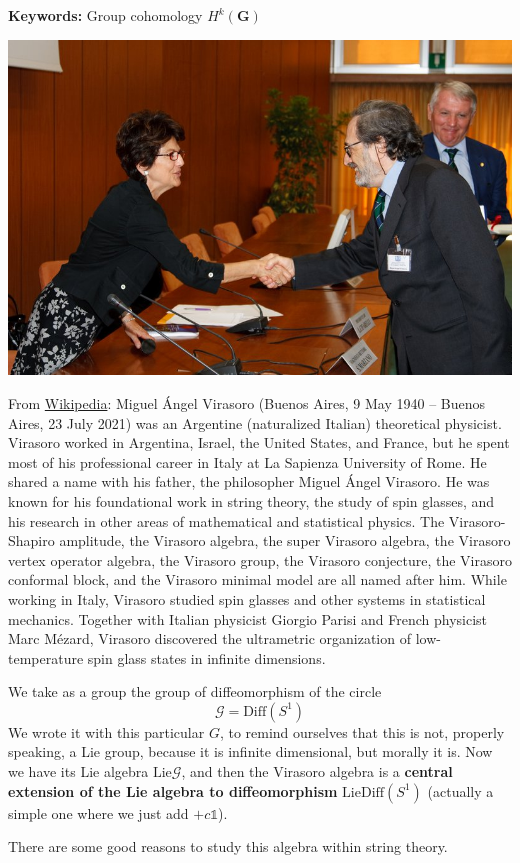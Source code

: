 \documentclass[../main.tex]{subfiles}
\begin{document}
\textbf{Keywords:} Group cohomology $H^k(\mathbf{G})$
\begin{marginfigure}
	\includegraphics[width=1\linewidth]{images/virasoro.jpg}
	\caption[Virasoro at the \textit{Premio E. Fermi 2009}]{From \href{https://en.wikipedia.org/wiki/Miguel_\%C3\%81ngel_Virasoro_(physicist)}{Wikipedia}: Miguel Ángel Virasoro (Buenos Aires, 9 May 1940 – Buenos Aires, 23 July 2021) was an Argentine (naturalized Italian) theoretical physicist. Virasoro worked in Argentina, Israel, the United States, and France, but he spent most of his professional career in Italy at La Sapienza University of Rome. He shared a name with his father, the philosopher Miguel Ángel Virasoro. He was known for his foundational work in string theory, the study of spin glasses, and his research in other areas of mathematical and statistical physics. The Virasoro-Shapiro amplitude, the Virasoro algebra, the super Virasoro algebra, the Virasoro vertex operator algebra, the Virasoro group, the Virasoro conjecture, the Virasoro conformal block, and the Virasoro minimal model are all named after him. While working in Italy, Virasoro studied spin glasses and other systems in statistical mechanics. Together with Italian physicist Giorgio Parisi and French physicist Marc Mézard, Virasoro discovered the ultrametric organization of low-temperature spin glass states in infinite dimensions.}
\end{marginfigure}
\begin{example}
We take as a group the group of diffeomorphism of the circle
\[
\mathcal{G}=\textrm{Diff}(S^1)
\]
We wrote it with this particular $G$, to remind ourselves that this is not, properly speaking, a Lie group, because it is infinite dimensional, but morally it is. Now we have its Lie algebra $\textrm{Lie}\mathcal{G}$, and then the Virasoro algebra is a \textbf{central extension of the Lie algebra to diffeomorphism} $\textrm{Lie}\textrm{Diff}(S^1)$ (actually a simple one where we just add $+c\mathbb{1}$).

There are some good reasons to study this algebra within string theory.
\end{example}
\end{document}
